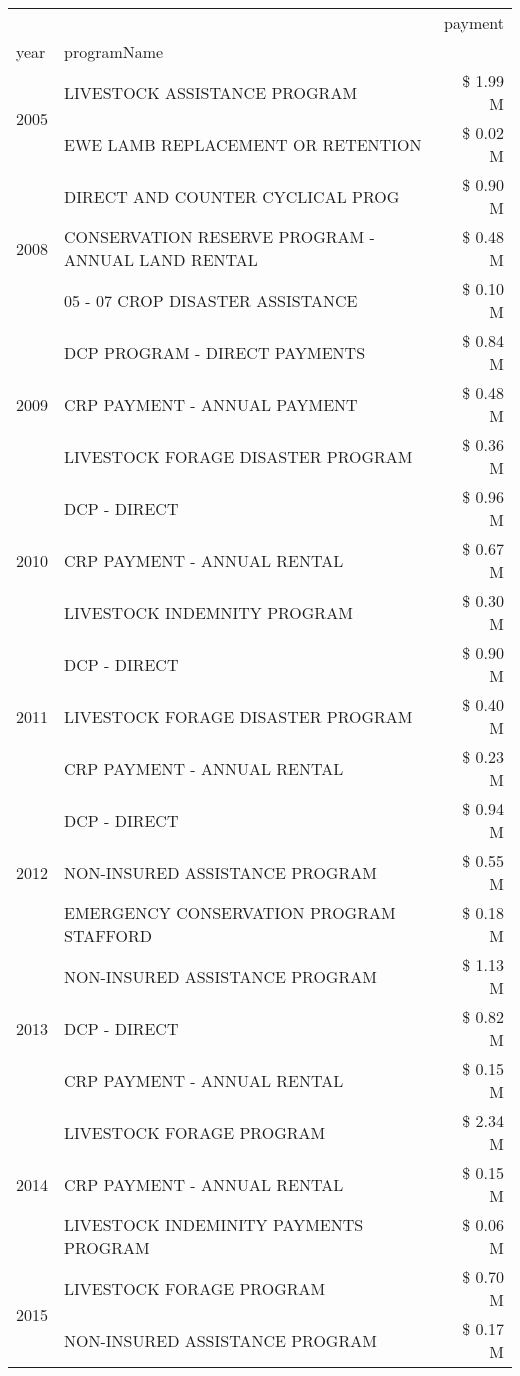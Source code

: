 \begin{tabular}{llr}
\toprule
 &  & payment \\
year & programName &  \\
\midrule
\multirow[t]{2}{*}{2005} & LIVESTOCK ASSISTANCE PROGRAM & \$ 1.99 M \\
 & EWE LAMB REPLACEMENT OR RETENTION & \$ 0.02 M \\
\cline{1-3}
\multirow[t]{3}{*}{2008} & DIRECT AND COUNTER CYCLICAL PROG & \$ 0.90 M \\
 & CONSERVATION RESERVE PROGRAM - ANNUAL LAND RENTAL & \$ 0.48 M \\
 & 05 - 07 CROP DISASTER ASSISTANCE & \$ 0.10 M \\
\cline{1-3}
\multirow[t]{3}{*}{2009} & DCP PROGRAM - DIRECT PAYMENTS & \$ 0.84 M \\
 & CRP PAYMENT - ANNUAL PAYMENT & \$ 0.48 M \\
 & LIVESTOCK FORAGE DISASTER  PROGRAM & \$ 0.36 M \\
\cline{1-3}
\multirow[t]{3}{*}{2010} & DCP - DIRECT & \$ 0.96 M \\
 & CRP PAYMENT - ANNUAL RENTAL & \$ 0.67 M \\
 & LIVESTOCK INDEMNITY PROGRAM & \$ 0.30 M \\
\cline{1-3}
\multirow[t]{3}{*}{2011} & DCP - DIRECT & \$ 0.90 M \\
 & LIVESTOCK FORAGE DISASTER PROGRAM & \$ 0.40 M \\
 & CRP PAYMENT - ANNUAL RENTAL & \$ 0.23 M \\
\cline{1-3}
\multirow[t]{3}{*}{2012} & DCP - DIRECT & \$ 0.94 M \\
 & NON-INSURED ASSISTANCE PROGRAM & \$ 0.55 M \\
 & EMERGENCY CONSERVATION PROGRAM STAFFORD & \$ 0.18 M \\
\cline{1-3}
\multirow[t]{3}{*}{2013} & NON-INSURED ASSISTANCE PROGRAM & \$ 1.13 M \\
 & DCP - DIRECT & \$ 0.82 M \\
 & CRP PAYMENT - ANNUAL RENTAL & \$ 0.15 M \\
\cline{1-3}
\multirow[t]{3}{*}{2014} & LIVESTOCK FORAGE PROGRAM & \$ 2.34 M \\
 & CRP PAYMENT - ANNUAL RENTAL & \$ 0.15 M \\
 & LIVESTOCK INDEMINITY PAYMENTS PROGRAM & \$ 0.06 M \\
\cline{1-3}
\multirow[t]{3}{*}{2015} & LIVESTOCK FORAGE PROGRAM & \$ 0.70 M \\
 & NON-INSURED ASSISTANCE PROGRAM & \$ 0.17 M \\

\end{tabular}
